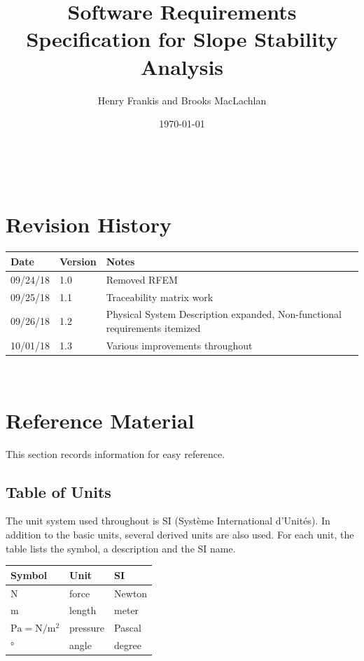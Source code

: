 \documentclass[12pt]{article}
\renewcommand{\arraystretch}{1}
\begin{document}
\title{Software Requirements Specification for Slope Stability Analysis}
\author{Henry Frankis and Brooks MacLachlan}
\date{\today}
	
\maketitle

~\newpage


\section{Revision History}

\begin{tabularx}{\textwidth}{p{3cm}p{2cm}X}
	\toprule {\bf Date} & {\bf Version} & {\bf Notes}\\
	\midrule
	09/24/18 & 1.0 & Removed RFEM\\
	09/25/18 & 1.1 & Traceability matrix work\\
	09/26/18 & 1.2 & Physical System Description expanded, Non-functional 
	requirements itemized\\
	10/01/18 & 1.3 & Various improvements throughout\\
	\bottomrule
\end{tabularx}

~\newpage

\section{Reference Material}
This section records information for easy reference.
\subsection{Table of Units}

The unit system used throughout is SI (Syst\`{e}me International d'Unit\'{e}s). 
In
 addition to the basic units, several derived units are also used. For each 
 unit, the table
 lists the symbol, a description and the SI name.
\newline

\renewcommand{\arraystretch}{1.2}
\setlength{\tabcolsep}{20pt}
\begin{tabular}{  l  l  l  }
\hline
\textbf{Symbol} & \textbf{Unit} & \textbf{SI} \\
\hline
\si{\newton} & force & Newton \\
\si{\meter} & length & meter \\
$\si{\pascal}=\si{\newton\per\square\meter}$ & pressure & Pascal \\
\si{\degree} & angle & degree  \\
\hline
\end{tabular}
\renewcommand{\arraystretch}{1}
\end{document}

